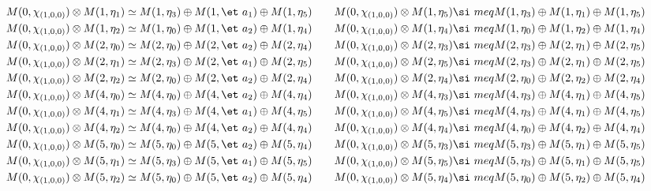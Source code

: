 \begin{align*}
M(0,\chi_{(1,0,0)}) &\otimes M(1,\eta_{1}) \simeq M(1,\eta_{3}) \oplus M(1,\et\
a_{1}) \oplus M(1,\eta_{5}) &&& M(0,\chi_{(1,0,0)}) &\otimes M(1,\eta_{5}) \si\
meq M(1,\eta_{3}) \oplus M(1,\eta_{1}) \oplus M(1,\eta_{5})\\
M(0,\chi_{(1,0,0)}) &\otimes M(1,\eta_{2}) \simeq M(1,\eta_{0}) \oplus M(1,\et\
a_{2}) \oplus M(1,\eta_{4}) &&& M(0,\chi_{(1,0,0)}) &\otimes M(1,\eta_{4}) \si\
meq M(1,\eta_{0}) \oplus M(1,\eta_{2}) \oplus M(1,\eta_{4})\\
M(0,\chi_{(1,0,0)}) &\otimes M(2,\eta_{0}) \simeq M(2,\eta_{0}) \oplus M(2,\et\
a_{2}) \oplus M(2,\eta_{4}) &&& M(0,\chi_{(1,0,0)}) &\otimes M(2,\eta_{3}) \si\
meq M(2,\eta_{3}) \oplus M(2,\eta_{1}) \oplus M(2,\eta_{5})\\
M(0,\chi_{(1,0,0)}) &\otimes M(2,\eta_{1}) \simeq M(2,\eta_{3}) \oplus M(2,\et\
a_{1}) \oplus M(2,\eta_{5}) &&& M(0,\chi_{(1,0,0)}) &\otimes M(2,\eta_{5}) \si\
meq M(2,\eta_{3}) \oplus M(2,\eta_{1}) \oplus M(2,\eta_{5})\\
M(0,\chi_{(1,0,0)}) &\otimes M(2,\eta_{2}) \simeq M(2,\eta_{0}) \oplus M(2,\et\
a_{2}) \oplus M(2,\eta_{4}) &&& M(0,\chi_{(1,0,0)}) &\otimes M(2,\eta_{4}) \si\
meq M(2,\eta_{0}) \oplus M(2,\eta_{2}) \oplus M(2,\eta_{4})\\
M(0,\chi_{(1,0,0)}) &\otimes M(4,\eta_{0}) \simeq M(4,\eta_{0}) \oplus M(4,\et\
a_{2}) \oplus M(4,\eta_{4}) &&& M(0,\chi_{(1,0,0)}) &\otimes M(4,\eta_{3}) \si\
meq M(4,\eta_{3}) \oplus M(4,\eta_{1}) \oplus M(4,\eta_{5})\\
M(0,\chi_{(1,0,0)}) &\otimes M(4,\eta_{1}) \simeq M(4,\eta_{3}) \oplus M(4,\et\
a_{1}) \oplus M(4,\eta_{5}) &&& M(0,\chi_{(1,0,0)}) &\otimes M(4,\eta_{5}) \si\
meq M(4,\eta_{3}) \oplus M(4,\eta_{1}) \oplus M(4,\eta_{5})\\
M(0,\chi_{(1,0,0)}) &\otimes M(4,\eta_{2}) \simeq M(4,\eta_{0}) \oplus M(4,\et\
a_{2}) \oplus M(4,\eta_{4}) &&& M(0,\chi_{(1,0,0)}) &\otimes M(4,\eta_{4}) \si\
meq M(4,\eta_{0}) \oplus M(4,\eta_{2}) \oplus M(4,\eta_{4})\\
M(0,\chi_{(1,0,0)}) &\otimes M(5,\eta_{0}) \simeq M(5,\eta_{0}) \oplus M(5,\et\
a_{2}) \oplus M(5,\eta_{4}) &&& M(0,\chi_{(1,0,0)}) &\otimes M(5,\eta_{3}) \si\
meq M(5,\eta_{3}) \oplus M(5,\eta_{1}) \oplus M(5,\eta_{5})\\
M(0,\chi_{(1,0,0)}) &\otimes M(5,\eta_{1}) \simeq M(5,\eta_{3}) \oplus M(5,\et\
a_{1}) \oplus M(5,\eta_{5}) &&& M(0,\chi_{(1,0,0)}) &\otimes M(5,\eta_{5}) \si\
meq M(5,\eta_{3}) \oplus M(5,\eta_{1}) \oplus M(5,\eta_{5})\\
M(0,\chi_{(1,0,0)}) &\otimes M(5,\eta_{2}) \simeq M(5,\eta_{0}) \oplus M(5,\et\
a_{2}) \oplus M(5,\eta_{4}) &&& M(0,\chi_{(1,0,0)}) &\otimes M(5,\eta_{4}) \si\
meq M(5,\eta_{0}) \oplus M(5,\eta_{2}) \oplus M(5,\eta_{4})\\
\end{align*}

